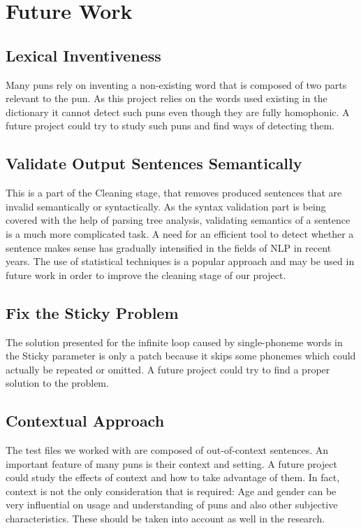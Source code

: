 \documentclass[11pt,a4paper]{article}
\begin{document}
\section{Future Work}

\subsection{Lexical Inventiveness}
Many puns rely on inventing a non-existing word that is composed of two parts relevant to the pun. As this project relies on the words used existing in the dictionary it cannot detect such puns even though they are fully homophonic. A future project could try to study such puns and find ways of detecting them.

\subsection{Validate Output Sentences Semantically}
This is a part of the Cleaning stage, that removes produced sentences that are invalid semantically or syntactically. As the syntax validation part is being covered with the help of parsing tree analysis, validating semantics of a sentence is a much more complicated task. A need for an efficient tool to detect whether a sentence makes sense has gradually intensified in the fields of NLP in recent years. The use of statistical techniques is a popular approach and may be used in future work in order to improve the cleaning stage of our project.

\subsection{Fix the Sticky Problem}
The solution presented for the infinite loop caused by single-phoneme words in the Sticky parameter is only a patch because it skips some phonemes which could actually be repeated or omitted. A future project could try to find a proper solution to the problem.

\subsection{Contextual Approach}
The test files we worked with are composed of out-of-context sentences. An important feature of many puns is their context and setting. A future project could study the effects of context and how to take advantage of them. In fact, context is not the only consideration that is required: Age and gender can be very influential on usage and understanding of puns and also other subjective characteristics. These should be taken into account as well in the research.
\end{document}
